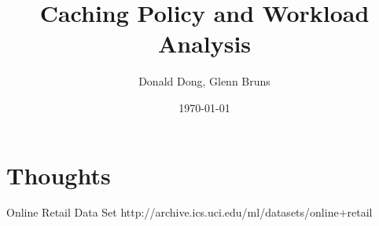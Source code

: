 \documentclass{article}
\title{Caching Policy and Workload Analysis}
\author{Donald Dong, Glenn Bruns}
\date{\today}
\begin{document}
  \maketitle
  
  \section{Thoughts}
  Online Retail Data Set
  http://archive.ics.uci.edu/ml/datasets/online+retail
  
  
\end{document}
